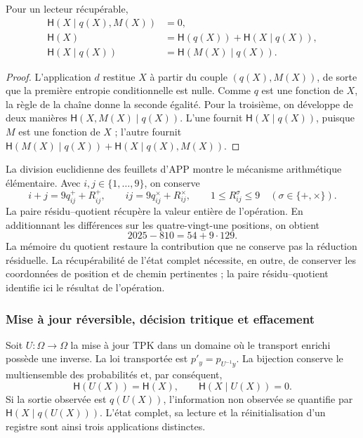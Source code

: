 \begin{proposition}
Pour un lecteur récupérable,
\begin{align}
 \mathsf H(X\mid q(X),M(X))&=0,\\
 \mathsf H(X)&=\mathsf H(q(X))+\mathsf H(X\mid q(X)),\\
 \mathsf H(X\mid q(X))&=\mathsf H(M(X)\mid q(X)).
 \label{eq:ii-kb-aut-fibra}
\end{align}
\end{proposition}
\begin{proof}
L'application \(d\) restitue \(X\) à partir du couple \((q(X),M(X))\),
de sorte que la première entropie conditionnelle est nulle. Comme \(q\) est
une fonction de \(X\), la règle de la chaîne donne la seconde égalité.
Pour la troisième, on développe de deux manières
\(\mathsf H(X,M(X)\mid q(X))\). L'une fournit
\(\mathsf H(X\mid q(X))\), puisque \(M\) est une fonction de \(X\) ;
l'autre fournit
\(\mathsf H(M(X)\mid q(X))+\mathsf H(X\mid q(X),M(X))\).
\end{proof}

La division euclidienne des feuillets d'APP montre le mécanisme
arithmétique élémentaire. Avec \(i,j\in\{1,\ldots,9\}\), on conserve
\[
 i+j=9q^+_{ij}+R^+_{ij},\qquad
 ij=9q^\times_{ij}+R^\times_{ij},\qquad
 1\leq R^\sigma_{ij}\leq9\quad(\sigma\in\{+,\times\}).
\]
La paire résidu--quotient récupère la valeur entière de l'opération. En additionnant les différences sur les quatre-vingt-une positions, on obtient
\[
 2025-810=54+9\cdot129.
\]
La mémoire du quotient restaure la contribution que ne conserve pas la
réduction résiduelle. La récupérabilité de l’état complet nécessite,
en outre, de conserver les coordonnées de position et de chemin pertinentes ;
la paire résidu--quotient identifie ici le résultat de l’opération.

\subsubsection{Mise à jour réversible, décision tritique et effacement}

Soit \(U:\Omega\to\Omega\) la mise à jour TPK dans un domaine où le transport enrichi possède une inverse. La loi transportée est \(p'_y=p_{U^{-1}y}\). La bijection conserve le multiensemble des probabilités et, par conséquent,
\begin{equation}
 \mathsf H(U(X))=\mathsf H(X),\qquad
 \mathsf H(X\mid U(X))=0.
 \label{eq:ii-kb-aut-reversible}
\end{equation}
Si la sortie observée est \(q(U(X))\), l’information non observée
se quantifie par \(\mathsf H(X\mid q(U(X)))\). L’état complet,
sa lecture et la réinitialisation d’un registre sont ainsi trois applications distinctes.

